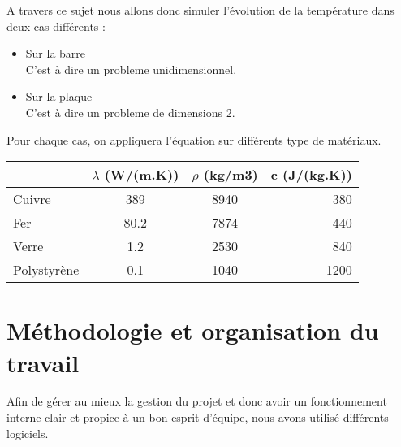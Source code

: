 \documentclass[french]{report}
\begin{document}
A travers ce sujet nous allons donc simuler l'évolution de la température dans deux cas différents :

\begin{itemize}
    \item Sur la barre \\
    C'est à dire un probleme unidimensionnel. 
    \item Sur la plaque \\
    C'est à dire un probleme de dimensions 2. \\
\end{itemize}

Pour chaque cas, on appliquera l'équation sur différents type de matériaux.

\begin{center}
   \begin{tabular}{| l | c | c | r |}
     \hline
      & $\lambda$ (W/(m.K)) & $\rho$ (kg/m3) & c (J/(kg.K))\\ \hline
     Cuivre & 389 & 8940 & 380 \\ \hline
     Fer & 80.2 & 7874 & 440 \\ \hline
     Verre & 1.2 & 2530 & 840 \\\hline
     Polystyrène & 0.1 & 1040 & 1200 \\
     \hline
   \end{tabular}
\end{center}
 
 
 
 
 
 

\chapter{Méthodologie et organisation du travail }
Afin de gérer au mieux la gestion du projet et donc avoir un fonctionnement interne clair et propice à un  bon esprit d'équipe, nous avons utilisé différents logiciels.
\end{document}
